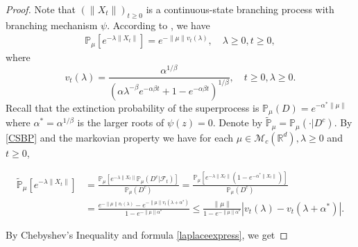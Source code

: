 \documentclass[12pt]{amsart}
\theoremstyle{plain}
\theoremstyle{definition}
\numberwithin{equation}{section}
\begin{document}
\begin{proof}
    Note that $(\|X_t\|)_{t\geq 0}$ is a continuous-state branching process with branching mechanism $\psi$. According to \cite[Example 3.1]{Li2011Measure-valued}, we have
\begin{align}\label{CSBP}
    \mathbb{P}_{\mu} [e^{-\lambda\|X_t\|}]
    =e^{-\|\mu\|v_t(\lambda)},
    \quad \lambda \geq 0, t\geq 0,
\end{align}
    where
\[
    v_t(\lambda)=\frac{\alpha^{1/\beta}}{(\alpha\lambda^{-\beta}e^{-\alpha \beta t}+1-e^{-\alpha \beta t})^{1/\beta}},\quad t\geq 0,\lambda\geq 0.
\]
    Recall that the extinction probability of the superprocess is $\mathbb{P}_{\mu}(D)=e^{-\alpha^*\|\mu\|}$ where $\alpha^*=\alpha^{1/\beta}$ is the larger roots of $\psi(z)=0$.
    Denote by $\mathbb{\tilde{P}}_{\mu}=\mathbb{P}_{\mu}(\cdot|D^c)$.
    By \eqref{CSBP} and the markovian property we have for each $\mu \in \mathcal M_c(\mathbb R^d), \lambda \geq 0$ and
    $t\geq 0$,

\begin{align}
    \label{laplaceexpress}
    \mathbb{\tilde{P}}_{\mu}[e^{-\lambda \|X_t\|}]
    &=\frac{ \mathbb P_\mu[e^{-\lambda \|X_t\| }\mathbb P_\mu(D^c| \mathscr F_t)] }{\mathbb P_\mu(D^c)}
    =\frac{ \mathbb P_\mu[e^{-\lambda \|X_t\| }(1-e^{-\alpha^*\|X_t\|})] }{\mathbb P_\mu(D^c)}
    \\&=\frac{e^{-\|\mu\|v_t(\lambda)}-e^{-\|\mu\|v_t(\lambda+\alpha^*)}}{1-e^{-\|\mu\|\alpha^*}}
    \leq \frac{\|\mu\|}{1-e^{-\|\mu\|\alpha^*}}\left|v_t(\lambda)-v_t(\lambda+\alpha^*)\right|.
\end{align}

By Chebyshev's Inequality and formula \eqref{laplaceexpress}, we get


\end{proof}
\end{document}
